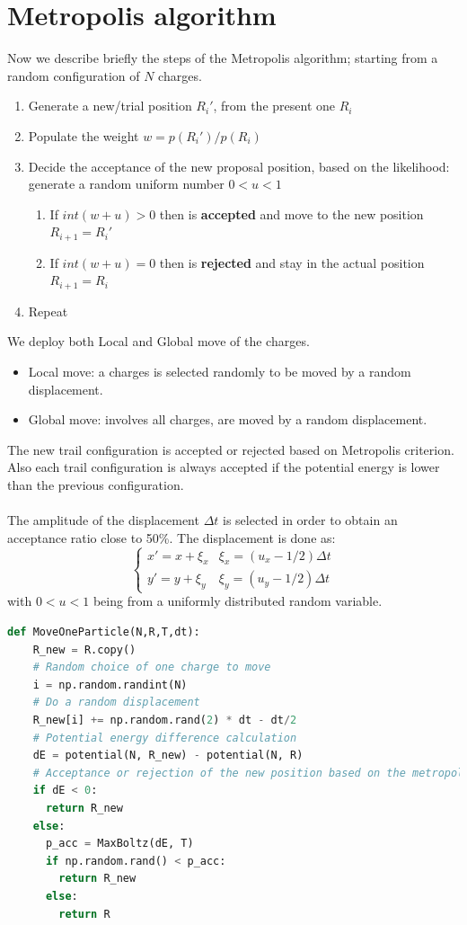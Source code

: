 \documentclass{article}
\begin{document}
\section{Metropolis algorithm}
Now we describe briefly the steps of the Metropolis algorithm; starting from a random configuration of $N$ charges.
\begin{enumerate}
    \item Generate a new/trial position $R_i'$, from the present one $R_i$
    \item Populate the weight $w = p(R_i')/p(R_i)$
    \item Decide the acceptance of the new proposal position, based on the likelihood:\\
    generate a random uniform number $0<u<1$
    \begin{enumerate}
        \item If $int(w+u)>0$ then is \textbf{accepted} and move to the new position $R_{i+1}=R_i'$
        \item If $int(w+u)=0$ then is \textbf{rejected} and stay in the actual position $R_{i+1}=R_i$
    \end{enumerate}
    \item Repeat
\end{enumerate}
We deploy both Local and Global move of the charges. 
\begin{itemize}
    \item Local move: a charges is selected randomly to be moved by a random displacement.
    \item Global move: involves all charges, are moved by a random displacement.
\end{itemize}
The new trail configuration is accepted or rejected based on Metropolis criterion. Also each trail configuration is always accepted if the potential energy is lower than the previous configuration.\\\\
The amplitude of the displacement $\Delta t$ is selected in order to obtain an acceptance ratio close to 50\%. The displacement is done as:
\begin{equation}
    \begin{cases}
        x'=x+\xi_x&\xi_x=(u_x-1/2)\Delta t\\
        y'=y+\xi_y&\xi_y=(u_y-1/2)\Delta t
    \end{cases}
\end{equation}
with $0<u<1$ being from a uniformly distributed random variable.
\begin{lstlisting}[language=Python]
def MoveOneParticle(N,R,T,dt):
    R_new = R.copy()
    # Random choice of one charge to move
    i = np.random.randint(N)
    # Do a random displacement
    R_new[i] += np.random.rand(2) * dt - dt/2
    # Potential energy difference calculation
    dE = potential(N, R_new) - potential(N, R)
    # Acceptance or rejection of the new position based on the metropolis algorithm
    if dE < 0:
      return R_new
    else:
      p_acc = MaxBoltz(dE, T)
      if np.random.rand() < p_acc:
        return R_new
      else:
        return R
\end{lstlisting}
\end{document}
